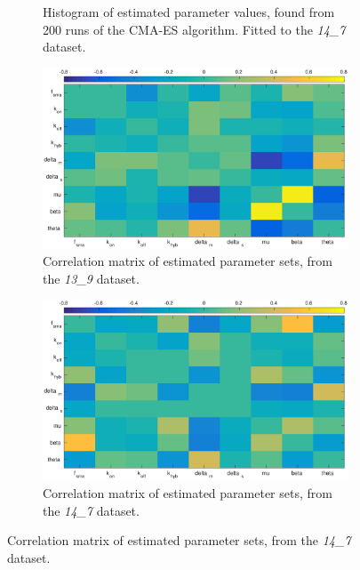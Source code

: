 \documentclass[10pt,journal]{./IEEE_latex_class/IEEEtran}
\begin{document}
\begin{figure}
\begin{subfigure}[c]{0.49\textwidth}
        \caption{Histogram of estimated parameter values, found from 200 runs of the CMA-ES algorithm. Fitted to the \textit{14\_7} dataset. }
        \label{InitialResults_14_7_hist}
    \end{subfigure}

        \begin{subfigure}[c]{0.49\textwidth}
        \centering
    \includegraphics[scale = 0.24, clip = true, trim = 120 0 70 0]{13_9_heatmap.eps}
        \caption{Correlation matrix of estimated parameter sets, from the  \textit{13\_9} dataset. }
        \label{InitialResults_13_9_correlation}
    \end{subfigure}
    \begin{subfigure}[c]{0.49\textwidth}
    \centering
        \includegraphics[scale = 0.24, clip = true, trim = 80 0 70 0]{14_7_heatmap.eps}
        \caption{Correlation matrix of estimated parameter sets, from the  \textit{14\_7} dataset.}
        \label{InitialResults_14_7_correlation}
    \end{subfigure}
    

\end{figure}
\end{document}
